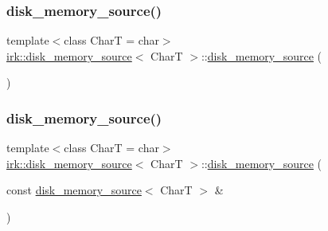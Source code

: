 \subsubsection{\texorpdfstring{disk\+\_\+memory\+\_\+source()}{disk\_memory\_source()}\hspace{0.1cm}{\footnotesize\ttfamily [1/5]}}
{\footnotesize\ttfamily template$<$class CharT  = char$>$ \\
\mbox{\hyperlink{classirk_1_1disk__memory__source}{irk\+::disk\+\_\+memory\+\_\+source}}$<$ CharT $>$\+::\mbox{\hyperlink{classirk_1_1disk__memory__source}{disk\+\_\+memory\+\_\+source}} (\begin{DoxyParamCaption}{ }\end{DoxyParamCaption})\hspace{0.3cm}{\ttfamily [default]}}

\mbox{\label{classirk_1_1disk__memory__source_ac30d797a76b0b077bcd6f41e80168d65}} 
\subsubsection{\texorpdfstring{disk\+\_\+memory\+\_\+source()}{disk\_memory\_source()}\hspace{0.1cm}{\footnotesize\ttfamily [2/5]}}
{\footnotesize\ttfamily template$<$class CharT  = char$>$ \\
\mbox{\hyperlink{classirk_1_1disk__memory__source}{irk\+::disk\+\_\+memory\+\_\+source}}$<$ CharT $>$\+::\mbox{\hyperlink{classirk_1_1disk__memory__source}{disk\+\_\+memory\+\_\+source}} (\begin{DoxyParamCaption}\item[{const \mbox{\hyperlink{classirk_1_1disk__memory__source}{disk\+\_\+memory\+\_\+source}}$<$ CharT $>$ \&}]{ }\end{DoxyParamCaption})\hspace{0.3cm}{\ttfamily [default]}}

\mbox{\label{classirk_1_1disk__memory__source_a4a1bac9b3e247452635cba43384f9e3f}} 
